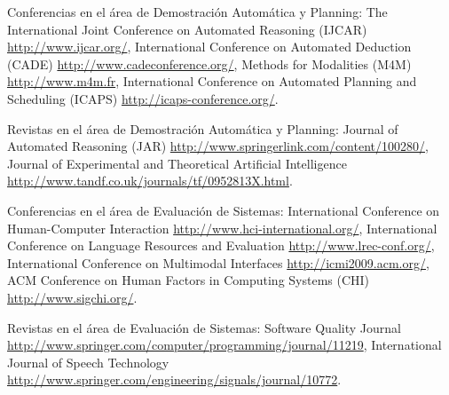 \begin{myitemize}
\item Conferencias en el \'area de Demostraci\'on Autom\'atica y Planning:
The International Joint Conference on
Automated Reasoning (IJCAR) \url{http://www.ijcar.org/},
International Conference on Automated Deduction (CADE) \url{http://www.cadeconference.org/},
Methods for Modalities (M4M) \url{http://www.m4m.fr},
International Conference on Automated Planning and Scheduling (ICAPS)
\url{http://icaps-conference.org/}.

\item Revistas en el \'area de Demostraci\'on Autom\'atica y Planning:
Journal of Automated Reasoning (JAR) \url{http://www.springerlink.com/content/100280/},
Journal of Experimental and Theoretical Artificial Intelligence
\url{http://www.tandf.co.uk/journals/tf/0952813X.html}.

\item Conferencias en el \'area de Evaluaci\'on de Sistemas: International Conference 
on Human-Com\-puter Interaction \url{http://www.hci-international.org/}, International 
Conference on Language Resources and Evaluation \url{http://www.lrec-conf.org/}, 
International Conference on Multimodal Interfaces \url{http://icmi2009.acm.org/}, 
ACM Conference on Human Factors in Computing Systems (CHI) \url{http://www.sigchi.org/}.

\item Revistas en el \'area de Evaluaci\'on de Sistemas: Software Quality Journal 
\url{http://www.springer.com/computer/programming/journal/11219}, International Journal 
of Speech Technology \url{http://www.springer.com/engineering/signals/journal/10772}.

\end{myitemize}

